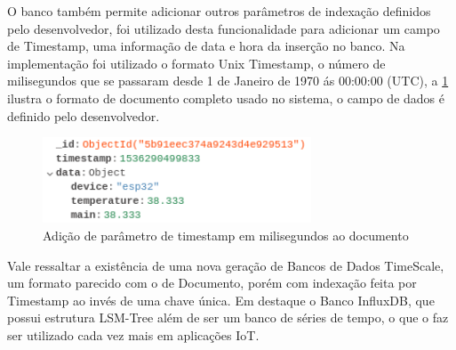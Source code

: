 O banco também permite adicionar outros parâmetros de indexação definidos pelo desenvolvedor, foi utilizado desta funcionalidade para adicionar um campo de Timestamp, uma informação de data e hora da inserção no banco. Na implementação foi utilizado o formato Unix Timestamp, o número de milisegundos que se passaram desde 1 de Janeiro de 1970 ás 00:00:00 (UTC), a \ref{fig:document-timestamp} ilustra o formato de documento completo usado no sistema, o campo de dados é definido pelo desenvolvedor. 

\begin{figure}[h!]
\centering
\includegraphics[width=8cm]{./02_Capitulos/02_Cap3/figures/document-timestamp}
\caption{Adição de parâmetro de timestamp em milisegundos ao documento}
\label{fig:document-timestamp}
\end{figure}

Vale ressaltar a existência de uma nova geração de Bancos de Dados TimeScale, um formato parecido com o de Documento, porém com indexação feita por Timestamp ao invés de uma chave única. Em destaque o Banco InfluxDB, que possui estrutura LSM-Tree além de ser um banco de séries de tempo, o que o faz ser utilizado cada vez mais em aplicações IoT.